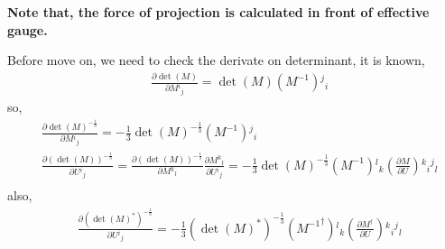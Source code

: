\textcolor[rgb]{1,0,0}{\textbf{Note that, the force of projection is calculated in front of effective gauge.}}

\begin{tcolorbox}
Before move on, we need to check the derivate on determinant, it is known,
\begin{equation}
\begin{split}
&\frac{\partial \det(M)}{\partial M{}^i{}_j}=\det(M)(M^{-1}){}^j{}_i
\end{split}
\end{equation}
so,
\begin{equation}
\begin{split}
&\frac{\partial \det(M)^{-\frac{1}{3}}}{\partial M{}^i{}_j}=-\frac{1}{3}\det(M)^{-\frac{1}{3}}(M^{-1}){}^j{}_i\\
&\frac{\partial (\det(M))^{-\frac{1}{3}}}{\partial U{}^i{}_j}=\frac{\partial (\det(M))^{-\frac{1}{3}}}{\partial M{}^k{}_l}\frac{\partial M{}^k{}_l}{\partial U{}^i{}_j}=-\frac{1}{3}\det(M)^{-\frac{1}{3}}(M^{-1}){}^l{}_k\left(\frac{\partial M}{\partial U}\right){}^k{}_i{}^j{}_l\\
\end{split}
\end{equation}
also,
\begin{equation}
\begin{split}
&\frac{\partial (\det(M)^*)^{-\frac{1}{3}}}{\partial U{}^i{}_j}=-\frac{1}{3}(\det(M)^*)^{-\frac{1}{3}}({M^{-1}}^{\dagger}){}^l{}_k\left(\frac{\partial M^{\dagger}}{\partial U}\right){}^k{}_i{}^j{}_l\\
\end{split}
\end{equation}

\end{tcolorbox}

